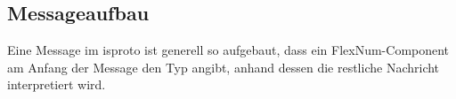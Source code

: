 

\subsection{Messageaufbau}
Eine Message im \gls{isproto} ist generell so aufgebaut, dass ein FlexNum-Component am Anfang der
Message den Typ angibt, anhand dessen die restliche Nachricht interpretiert wird.

